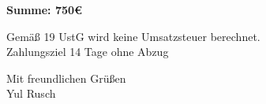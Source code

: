 \documentclass[12pt]{article}
\begin{document}
\vspace{2cm}

\begin{flushleft}

\textbf{Summe: \mbox{\hspace{12.7cm}} 750€}

\vspace{0.2cm}

Gemäß 19 UstG wird keine Umsatzsteuer berechnet.\\
Zahlungsziel 14 Tage ohne Abzug\\

\vspace{0.5cm}

Mit freundlichen Grüßen\\
Yul Rusch

\end{flushleft}
\end{document}
